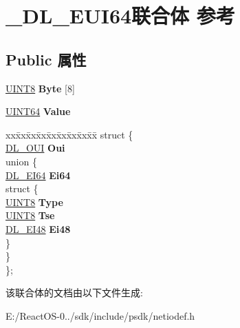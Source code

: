 \hypertarget{union___d_l___e_u_i64}{}\section{\+\_\+\+D\+L\+\_\+\+E\+U\+I64联合体 参考}
\label{union___d_l___e_u_i64}
\subsection*{Public 属性}
\begin{DoxyCompactItemize}
\item 
\mbox{\label{union___d_l___e_u_i64_acc151904cc4e5e605e52417fa6a9e099}} 
\hyperlink{_processor_bind_8h_ab27e9918b538ce9d8ca692479b375b6a}{U\+I\+N\+T8} {\bfseries Byte} \mbox{[}8\mbox{]}
\item 
\mbox{\label{union___d_l___e_u_i64_a2e4aa610790919ad4803cdb954881d16}} 
\hyperlink{_processor_bind_8h_a57be03562867144161c1bfee95ca8f7c}{U\+I\+N\+T64} {\bfseries Value}
\item 
\mbox{\label{union___d_l___e_u_i64_abfa905bcdf22180e74cf2b73190444df}} 
\begin{tabbing}
xx\=xx\=xx\=xx\=xx\=xx\=xx\=xx\=xx\=\kill
struct \{\\
\>\hyperlink{union___d_l___o_u_i}{DL\_OUI} {\bfseries Oui}\\
\mbox{\label{struct___d_l___e_u_i64_1_1_0D2606_a8de27c1d986a919f5cbcabd578fa23b6}} 
\>union \{\\
\>\>\hyperlink{union___d_l___e_i64}{DL\_EI64} {\bfseries Ei64}\\
\mbox{\label{union___d_l___e_u_i64_1_1_0D2606_1_1_0D2608_aa4c4f4bdb86bd466c7c63ff874b624ff}} 
\>\>struct \{\\
\>\>\>\hyperlink{_processor_bind_8h_ab27e9918b538ce9d8ca692479b375b6a}{UINT8} {\bfseries Type}\\
\>\>\>\hyperlink{_processor_bind_8h_ab27e9918b538ce9d8ca692479b375b6a}{UINT8} {\bfseries Tse}\\
\>\>\>\hyperlink{union___d_l___e_i48}{DL\_EI48} {\bfseries Ei48}\\
\>\>\} \\
\>\} \\
\}; \\

\end{tabbing}\end{DoxyCompactItemize}


该联合体的文档由以下文件生成\+:\begin{DoxyCompactItemize}
\item 
E\+:/\+React\+O\+S-\/0../sdk/include/psdk/netiodef.\+h\end{DoxyCompactItemize}
